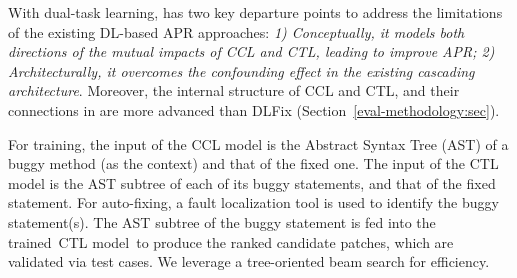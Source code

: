 %
With dual-task learning, {\tool} has two key departure points to
address the limitations of the existing DL-based APR approaches: {\em
  1) Conceptually, it models both directions of the mutual impacts of
  CCL and CTL, leading to improve APR; 2) Architecturally, it
  overcomes the confounding effect in the existing cascading
  architecture}. Moreover, the internal structure of CCL and CTL, and
their connections in {\tool} are more advanced than DLFix
(Section~\ref{eval-methodology:sec}).

For training, the input of the CCL model is the Abstract Syntax Tree
(AST) of a buggy method (as the context) and that of the fixed one.
The input of the CTL model is the AST subtree of each of its buggy
statements, and that of the fixed statement. For
auto-fixing, a fault localization tool is used to identify the buggy
statement(s). The AST subtree of the buggy statement is fed into the
trained~CTL model~to produce the ranked candidate patches, which are
validated via test cases. We leverage a tree-oriented beam search for
efficiency.


